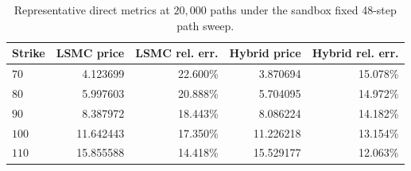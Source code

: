\begin{table}[H]
\centering
\caption{Representative direct metrics at $20{,}000$ paths under the sandbox fixed 48-step path sweep.}
\label{tab:sandbox-bgk-r02-t1-delta05-nex12-path48-path20k}
\begin{tabular}{lrrrr}
\toprule
Strike & LSMC price & LSMC rel. err. & Hybrid price & Hybrid rel. err. \\
\midrule
$70$ & 4.123699 & 22.600\% & 3.870694 & 15.078\% \\
$80$ & 5.997603 & 20.888\% & 5.704095 & 14.972\% \\
$90$ & 8.387972 & 18.443\% & 8.086224 & 14.182\% \\
$100$ & 11.642443 & 17.350\% & 11.226218 & 13.154\% \\
$110$ & 15.855588 & 14.418\% & 15.529177 & 12.063\% \\
\bottomrule
\end{tabular}
\end{table}
